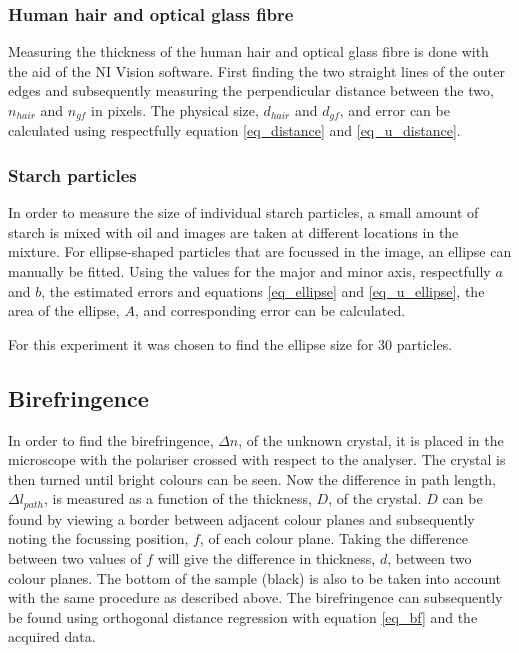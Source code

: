 \subsubsection*{Human hair and optical glass fibre}


Measuring the thickness of the human hair and optical glass fibre is done with the aid of the NI Vision software. First finding the two straight lines of the outer edges and subsequently measuring the perpendicular distance between the two, $n_{hair}$ and $n_{gf}$ in pixels. The physical size, $d_{hair}$ and $d_{gf}$, and error can be calculated using respectfully equation \ref{eq_distance} and \ref{eq_u_distance}. 


\subsubsection*{Starch particles}

In order to measure the size of individual starch particles, a small amount of starch is mixed with oil and images are taken at different locations in the mixture. For ellipse-shaped particles that are focussed in the image, an ellipse can manually be fitted. Using the values for the major and minor axis, respectfully $a$ and $b$, the estimated errors and equations \ref{eq_ellipse} and \ref{eq_u_ellipse}, the area of the ellipse, $A$, and corresponding error can be calculated.

For this experiment it was chosen to find the ellipse size for 30 particles.


\subsection{Birefringence}

In order to find the birefringence, $\Delta n$, of the unknown crystal, it is placed in the microscope with the polariser crossed with respect to the analyser. The crystal is then turned until bright colours can be seen. Now the difference in path length, $\Delta l_{path}$, is measured as a function of the thickness, $D$, of the crystal. $D$ can be found by viewing a border between adjacent colour planes and subsequently noting the focussing position, $f$, of each colour plane. Taking the difference between two values of $f$ will give the difference in thickness, $d$, between two colour planes. The bottom of the sample (black) is also to be taken into account with the same procedure as described above. The birefringence can subsequently be found using orthogonal distance regression with equation \ref{eq_bf} and the acquired data.

